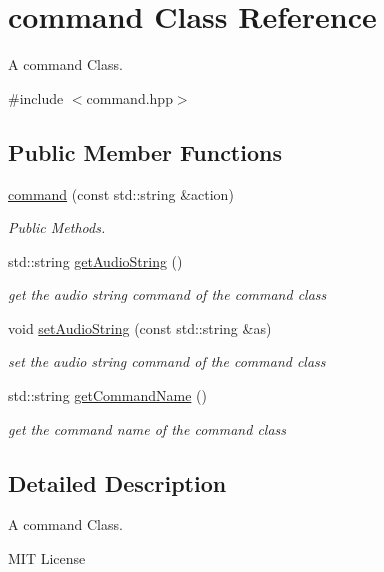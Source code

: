 \hypertarget{classcommand}{}\section{command Class Reference}
\label{classcommand}


A command Class.  




{\ttfamily \#include $<$command.\+hpp$>$}

\subsection*{Public Member Functions}
\begin{DoxyCompactItemize}
\item 
\hyperlink{classcommand_a73ec064106643d84d3f4a70920223821}{command} (const std\+::string \&action)
\begin{DoxyCompactList}\small\item\em Public Methods. \end{DoxyCompactList}\item 
std\+::string \hyperlink{classcommand_ae7d5eacad57039ffb83c3d59b3cb18ef}{get\+Audio\+String} ()
\begin{DoxyCompactList}\small\item\em get the audio string command of the command class \end{DoxyCompactList}\item 
void \hyperlink{classcommand_ae50e70ff9209a54629d57d2fcf233544}{set\+Audio\+String} (const std\+::string \&as)
\begin{DoxyCompactList}\small\item\em set the audio string command of the command class \end{DoxyCompactList}\item 
std\+::string \hyperlink{classcommand_a706987b84fa26e55bf9ade6dc23b8502}{get\+Command\+Name} ()
\begin{DoxyCompactList}\small\item\em get the command name of the command class \end{DoxyCompactList}\end{DoxyCompactItemize}


\subsection{Detailed Description}
A command Class. 

M\+IT License

